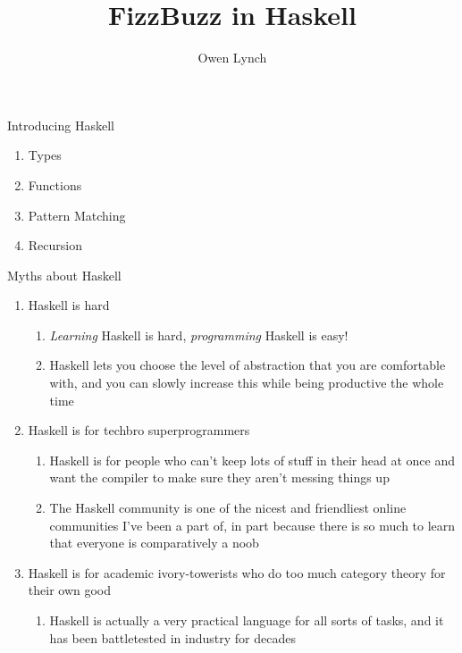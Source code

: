 \documentclass{beamer}
\title{FizzBuzz in Haskell}
\author{Owen Lynch}
\begin{document}

\begin{frame}
  \titlepage
\end{frame}


\begin{frame}{Introducing Haskell}
  \factCode
  \begin{enumerate}
    \pause
    \item Types
    \pause
    \item Functions
    \pause
    \item Pattern Matching
    \pause
    \item Recursion
  \end{enumerate}
\end{frame}

\begin{frame}{Myths about Haskell}
  \begin{enumerate}
    \pause
    \item Haskell is hard
    \pause
    \begin{enumerate}
      \item \textit{Learning} Haskell is hard, \textit{programming} Haskell is easy!
      \pause
      \item Haskell lets you choose the level of abstraction that you are comfortable with, and you can slowly increase this while being productive the whole time
    \end{enumerate}
    \pause
    \item Haskell is for techbro superprogrammers
    \begin{enumerate}
      \pause
      \item Haskell is for people who can't keep lots of stuff in their head at once and want the compiler to make sure they aren't messing things up
      \pause
      \item The Haskell community is one of the nicest and friendliest online communities I've been a part of, in part because there is so much to learn that everyone is comparatively a noob
    \end{enumerate}
    \pause
    \item Haskell is for academic ivory-towerists who do too much category theory for their own good
    \begin{enumerate}
      \pause
      \item Haskell is actually a very practical language for all sorts of tasks, and it has been battletested in industry for decades
    \end{enumerate}
  \end{enumerate}
\end{frame}
\end{document}
